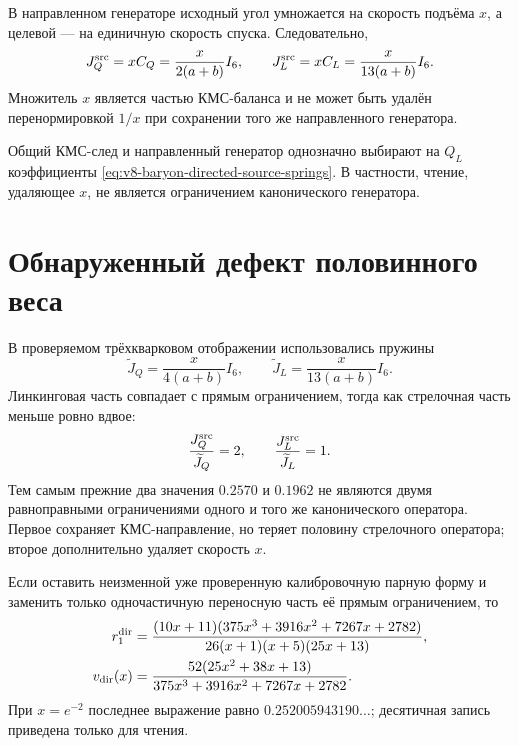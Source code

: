 В направленном генераторе исходный угол умножается на скорость подъёма
$x$, а целевой --- на единичную скорость спуска. Следовательно,
\begin{equation}
 J_Q^{\rm src}=xC_Q=\frac{x}{2(a+b)}I_6,
 \qquad
 J_L^{\rm src}=xC_L=\frac{x}{13(a+b)}I_6.
 \label{eq:v8-baryon-directed-source-springs}
\end{equation}
Множитель $x$ является частью КМС-баланса и не может быть удалён
перенормировкой $1/x$ при сохранении того же направленного генератора.

\begin{proposition}
Общий КМС-след и направленный генератор однозначно выбирают на $Q_L$
коэффициенты \eqref{eq:v8-baryon-directed-source-springs}. В частности,
чтение, удаляющее $x$, не является ограничением канонического генератора.
\end{proposition}

\section{Обнаруженный дефект половинного веса}

В проверяемом трёхкварковом отображении использовались пружины
\begin{equation}
 \widetilde J_Q=\frac{x}{4(a+b)}I_6,
 \qquad
 \widetilde J_L=\frac{x}{13(a+b)}I_6.
 \label{eq:v8-baryon-supplied-transfer-springs}
\end{equation}
Линкинговая часть совпадает с прямым ограничением, тогда как стрелочная
часть меньше ровно вдвое:
\begin{equation}
 \frac{J_Q^{\rm src}}{\widetilde J_Q}=2,
 \qquad
 \frac{J_L^{\rm src}}{\widetilde J_L}=1.
 \label{eq:v8-baryon-transfer-required-multipliers}
\end{equation}
Тем самым прежние два значения $0.2570$ и $0.1962$ не являются двумя
равноправными ограничениями одного и того же канонического оператора.
Первое сохраняет КМС-направление, но теряет половину стрелочного оператора;
второе дополнительно удаляет скорость $x$.

Если оставить неизменной уже проверенную калибровочную парную форму и
заменить только одночастичную переносную часть её прямым ограничением, то
\begin{align}
 r_1^{\rm dir}
 &=\frac{(10x+11)(375x^3+3916x^2+7267x+2782)}
 {26(x+1)(x+5)(25x+13)},
 \\
 v_{\rm dir}(x)
 &=\frac{52(25x^2+38x+13)}
 {375x^3+3916x^2+7267x+2782}.
 \label{eq:v8-baryon-direct-restriction-discriminator}
\end{align}
При $x=e^{-2}$ последнее выражение равно
$0.252005943190\ldots$; десятичная запись приведена только для чтения.

